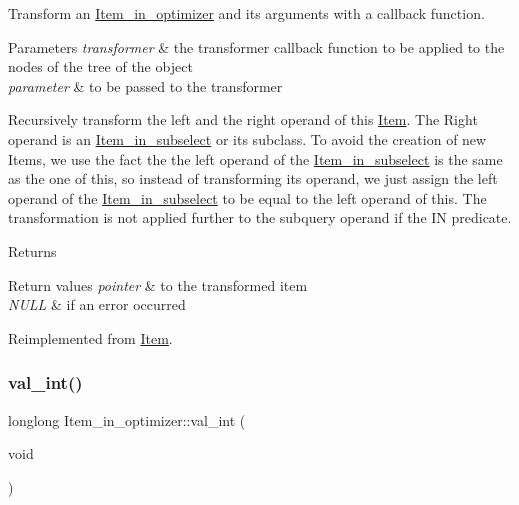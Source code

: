 Transform an \mbox{\hyperlink{classItem__in__optimizer}{Item\+\_\+in\+\_\+optimizer}} and its arguments with a callback function.


\begin{DoxyParams}{Parameters}
{\em transformer} & the transformer callback function to be applied to the nodes of the tree of the object \\
\hline
{\em parameter} & to be passed to the transformer\\
\hline
\end{DoxyParams}
Recursively transform the left and the right operand of this \mbox{\hyperlink{classItem}{Item}}. The Right operand is an \mbox{\hyperlink{classItem__in__subselect}{Item\+\_\+in\+\_\+subselect}} or its subclass. To avoid the creation of new Items, we use the fact the the left operand of the \mbox{\hyperlink{classItem__in__subselect}{Item\+\_\+in\+\_\+subselect}} is the same as the one of \textquotesingle{}this\textquotesingle{}, so instead of transforming its operand, we just assign the left operand of the \mbox{\hyperlink{classItem__in__subselect}{Item\+\_\+in\+\_\+subselect}} to be equal to the left operand of \textquotesingle{}this\textquotesingle{}. The transformation is not applied further to the subquery operand if the IN predicate.

\begin{DoxyReturn}{Returns}

\end{DoxyReturn}

\begin{DoxyRetVals}{Return values}
{\em pointer} & to the transformed item \\
\hline
{\em N\+U\+LL} & if an error occurred \\
\hline
\end{DoxyRetVals}


Reimplemented from \mbox{\hyperlink{classItem_ae4459c9d19c2c656c63da3bbd32760e5}{Item}}.

\mbox{\label{classItem__in__optimizer_a24ae21b54394fd097a1b9ec9fd812bd9}} 
\subsubsection{\texorpdfstring{val\+\_\+int()}{val\_int()}}
{\footnotesize\ttfamily longlong Item\+\_\+in\+\_\+optimizer\+::val\+\_\+int (\begin{DoxyParamCaption}\item[{void}]{ }\end{DoxyParamCaption})\hspace{0.3cm}{\ttfamily [virtual]}}

